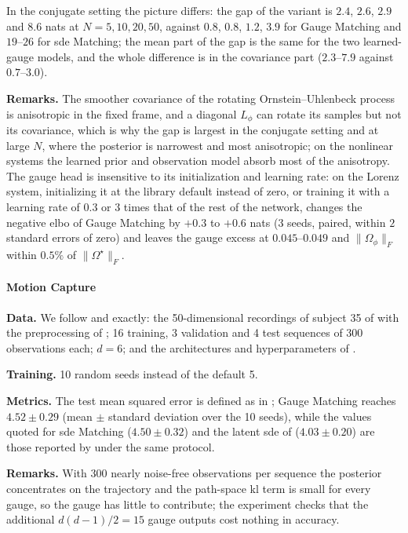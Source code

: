 \documentclass{article} %
\newcommand{\gauge}{\Omega}
\begin{document}
In the conjugate setting the picture differs: the gap of the variant is $2.4$, $2.6$, $2.9$ and $8.6$ nats at $N = 5, 10, 20, 50$, against $0.8$, $0.8$, $1.2$, $3.9$ for Gauge Matching and $19$--$26$ for \gls{sde} Matching; the mean part of the gap is the same for the two learned-gauge models, and the whole difference is in the covariance part ($2.3$--$7.9$ against $0.7$--$3.0$).

\textbf{Remarks.} The smoother covariance of the rotating Ornstein--Uhlenbeck process is anisotropic in the fixed frame, and a diagonal $L_\phi$ can rotate its samples but not its covariance, which is why the gap is largest in the conjugate setting and at large $N$, where the posterior is narrowest and most anisotropic; on the nonlinear systems the learned prior and observation model absorb most of the anisotropy. The gauge head is insensitive to its initialization and learning rate: on the Lorenz system, initializing it at the library default instead of zero, or training it with a learning rate of $0.3$ or $3$ times that of the rest of the network, changes the negative \gls{elbo} of Gauge Matching by $+0.3$ to $+0.6$ nats (3 seeds, paired, within $2$ standard errors of zero) and leaves the gauge excess at $0.045$--$0.049$ and $\|\gauge_\phi\|_F$ within $0.5\%$ of $\|\gauge^\star\|_F$.

\paragraph{Motion Capture}
\textbf{Data.} We follow \citet{li2020scalable} and \citet{bartosh2025sde} exactly: the 50-dimensional recordings of subject 35 of \citet{gan2015deep} with the preprocessing of \citet{wang2007gaussian}; 16 training, 3 validation and 4 test sequences of 300 observations each; $d = 6$; and the architectures and hyperparameters of \citet{li2020scalable}.

\textbf{Training.} 10 random seeds instead of the default 5.

\textbf{Metrics.} The test mean squared error is defined as in \citet[Table 2]{bartosh2025sde}; Gauge Matching reaches $4.52 \pm 0.29$ (mean $\pm$ standard deviation over the 10 seeds), while the values quoted for \gls{sde} Matching ($4.50 \pm 0.32$) and the latent \gls{sde} of \citet{li2020scalable} ($4.03 \pm 0.20$) are those reported by \citet{bartosh2025sde} under the same protocol.

\textbf{Remarks.} With 300 nearly noise-free observations per sequence the posterior concentrates on the trajectory and the path-space \gls{kl} term is small for every gauge, so the gauge has little to contribute; the experiment checks that the additional $d(d-1)/2 = 15$ gauge outputs cost nothing in accuracy.
\end{document}
